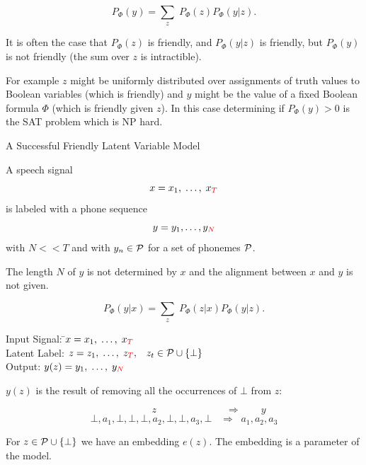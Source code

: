 {

{\color{red} $$P_\Phi(y) = \sum_z\;P_\Phi(z)P_\Phi(y|z).$$}

\vfill
It is often the case that $P_\Phi(z)$ is friendly, and $P_\Phi(y|z)$ is friendly, but $P_\Phi(y)$ is not friendly (the sum over $z$ is intractible).

\vfill
For example $z$ might be uniformly distributed over assignments of truth values to Boolean variables (which is friendly) and $y$ might be the value of a fixed Boolean formula $\Phi$ (which is friendly given $z$).  In this case
determining if $P_\Phi(y) > 0$ is the SAT problem which is NP hard.

{A Successful Friendly Latent Variable Model}

A speech signal
$$x = x_1,\; \ldots,\; x_{\color{red} T}$$
is labeled with a phone sequence
$$y = y_1, \ldots, y_{\color{red} N}$$
with {\color{red} $N << T$} and with $y_n \in {\cal P}$ for a set of phonemes ${\cal P}$.

\vfill
{\color{red} The length $N$ of $y$ is not determined by $x$ and the alignment between $x$ and $y$ is not given.}


{\color{red} $$P_\Phi(y|x) = \sum_z\;P_\Phi(z|x)P_\Phi(y|z).$$}

\vfill
\begin{tabbing}
Input Signal: \hspace{3em} \=$x = x_1,\;\ldots,\;x_{\color{red} T}$ \\
Latent Label: \>$z = z_1,\;\ldots,\;z_{\color{red} T},\;\;\;z_t \in {\cal P} \cup \{\bot\}$ \\
Output: \>$y(z) = y_1,\;\ldots,\;y_{\color{red} N}$
\end{tabbing}

\vfill
$y(z)$ is the result of removing all the occurrences of $\bot$ from $z$:

{\color{red} $$\hspace{5em} z \hspace{7em} \Rightarrow \hspace{2em} y$$}
{\color{red} $$\bot,a_1,\bot,\bot,\bot,a_2,\bot,\bot,a_3,\bot \;\;\;\Rightarrow\;\; a_1,a_2,a_3$$}



For $z \in {\cal P} \cup \{\bot\}$ we have an embedding $e(z)$.  The embedding is a parameter of the model.

}
